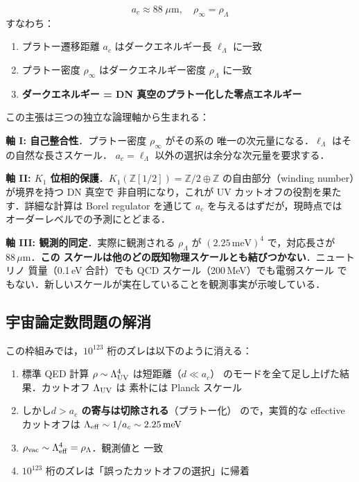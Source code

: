 \documentclass[11pt,a4paper]{article}
\begin{document}
\begin{tcolorbox}[colback=yellow!10,colframe=orange!60!black,title=中心主張]
\begin{equation}
\boxed{a_c \approx 88\;\mu\text{m}, \quad \rho_\infty = \rho_\Lambda}
\end{equation}
すなわち：
\begin{enumerate}
\item プラトー遷移距離 $a_c$ はダークエネルギー長 $\ell_\Lambda$ に一致
\item プラトー密度 $\rho_\infty$ はダークエネルギー密度 $\rho_\Lambda$ に一致
\item \textbf{ダークエネルギー = DN 真空のプラトー化した零点エネルギー}
\end{enumerate}
\end{tcolorbox}

この主張は三つの独立な論理軸から生まれる：

\textbf{軸 I: 自己整合性}．プラトー密度 $\rho_\infty$ がその系の
唯一の次元量になる．$\ell_\Lambda$ はその自然な長さスケール．
$a_c = \ell_\Lambda$ 以外の選択は余分な次元量を要求する．

\textbf{軸 II: $K_1$ 位相的保護}．$K_1(\mathbb Z[1/2]) = \mathbb Z/2 \oplus
\mathbb Z$ の自由部分（winding number）が境界を持つ DN 真空で
非自明になり，これが UV カットオフの役割を果たす．詳細な計算は
Borel regulator を通じて $a_c$ を与えるはずだが，現時点では
オーダーレベルでの予測にとどまる．

\textbf{軸 III: 観測的同定}．実際に観測される $\rho_\Lambda$ が
$(2.25\,\text{meV})^4$ で，対応長さが $88\,\mu$m．\textbf{この
スケールは他のどの既知物理スケールとも結びつかない}．ニュートリノ
質量（0.1\,eV 合計）でも QCD スケール（200\,MeV）でも電弱スケール
でもない．新しいスケールが実在していることを観測事実が示唆している．

\subsection{宇宙論定数問題の解消}

この枠組みでは，$10^{123}$ 桁のズレは以下のように消える：

\begin{enumerate}
\item 標準 QED 計算 $\rho \sim \Lambda_{\rm UV}^4$ は短距離（$d \ll a_c$）
のモードを全て足し上げた結果．カットオフ $\Lambda_{\rm UV}$ は
素朴には Planck スケール
\item しかし\textbf{$d > a_c$ の寄与は切除される}（プラトー化）
ので，実質的な effective カットオフは $\Lambda_{\rm eff} \sim
1/a_c \sim 2.25\,\text{meV}$
\item $\rho_{\rm vac} \sim \Lambda_{\rm eff}^4 = \rho_\Lambda$．観測値と
一致
\item $10^{123}$ 桁のズレは「誤ったカットオフの選択」に帰着
\end{enumerate}
\end{document}
